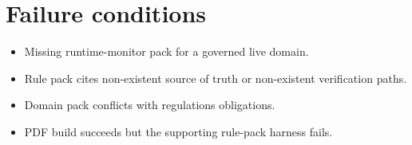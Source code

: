 \section{Failure conditions}

\begin{itemize}
  \item Missing runtime-monitor pack for a governed live domain.
  \item Rule pack cites non-existent source of truth or non-existent
    verification paths.
  \item Domain pack conflicts with regulations obligations.
  \item PDF build succeeds but the supporting rule-pack harness fails.
\end{itemize}
